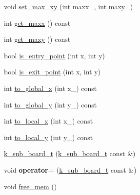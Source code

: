 \begin{DoxyCompactItemize}
\item 
void \hyperlink{classknight__path__t_1_1k__sub__board__t_a8d62b7f16925f3ec15b0af8f1dd33812}{set\-\_\-max\-\_\-xy} (int maxx\-\_\-, int maxy\-\_\-)
\item 
int \hyperlink{classknight__path__t_1_1k__sub__board__t_ac5727a9f4c46cc735e9831ef57d3e6fc}{get\-\_\-maxx} () const 
\item 
int \hyperlink{classknight__path__t_1_1k__sub__board__t_a105d7f37f9e2d12365aa407f2e754569}{get\-\_\-maxy} () const 
\item 
bool \hyperlink{classknight__path__t_1_1k__sub__board__t_aad32dee48d2627e6188ea6e54bbfc6b3}{is\-\_\-entry\-\_\-point} (int x, int y)
\item 
bool \hyperlink{classknight__path__t_1_1k__sub__board__t_a3d1292982ea6dedfd277d1fba17d228c}{is\-\_\-exit\-\_\-point} (int x, int y)
\item 
int \hyperlink{classknight__path__t_1_1k__sub__board__t_ae5661793ae4e61f0497ee5adf9f51b31}{to\-\_\-global\-\_\-x} (int x\-\_\-) const 
\item 
int \hyperlink{classknight__path__t_1_1k__sub__board__t_abf522468d9a74b6ebc7f803502748a2a}{to\-\_\-global\-\_\-y} (int y\-\_\-) const 
\item 
int \hyperlink{classknight__path__t_1_1k__sub__board__t_a78e9a721c60809b2cecc505c51a68f87}{to\-\_\-local\-\_\-x} (int x\-\_\-) const 
\item 
int \hyperlink{classknight__path__t_1_1k__sub__board__t_a91134f637addb20bb0523c8884264577}{to\-\_\-local\-\_\-y} (int y\-\_\-) const 
\item 
\hyperlink{classknight__path__t_1_1k__sub__board__t_aba699fd39e940e635fd5ae6cb2f8d6b0}{k\-\_\-sub\-\_\-board\-\_\-t} (\hyperlink{classknight__path__t_1_1k__sub__board__t}{k\-\_\-sub\-\_\-board\-\_\-t} const \&)
\item 
\hypertarget{classknight__path__t_1_1k__sub__board__t_a183d4b5222e58fa6c33fe1153bbccb85}{void {\bfseries operator=} (\hyperlink{classknight__path__t_1_1k__sub__board__t}{k\-\_\-sub\-\_\-board\-\_\-t} const \&)}\label{classknight__path__t_1_1k__sub__board__t_a183d4b5222e58fa6c33fe1153bbccb85}

\item 
void \hyperlink{classknight__path__t_1_1k__sub__board__t_a87c8d43be4c724e2123ff038d216d6c9}{free\-\_\-mem} ()
\end{DoxyCompactItemize}

